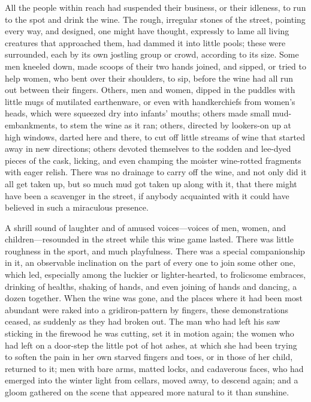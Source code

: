 All the people within reach had suspended their business, or their
idleness, to run to the spot and drink the wine.  The rough,
irregular stones of the street, pointing every way, and designed,
one might have thought, expressly to lame all living creatures that
approached them, had dammed it into little pools; these were surrounded,
each by its own jostling group or crowd, according to its size.
Some men kneeled down, made scoops of their two hands joined, and
sipped, or tried to help women, who bent over their shoulders, to
sip, before the wine had all run out between their fingers.  Others,
men and women, dipped in the puddles with little mugs of mutilated
earthenware, or even with handkerchiefs from women's heads, which
were squeezed dry into infants' mouths; others made small mud-%
embankments, to stem the wine as it ran; others, directed by
lookers-on up at high windows, darted here and there, to cut off
little streams of wine that started away in new directions; others
devoted themselves to the sodden and lee-dyed pieces of the cask,
licking, and even champing the moister wine-rotted fragments with
eager relish.  There was no drainage to carry off the wine, and not
only did it all get taken up, but so much mud got taken up along with
it, that there might have been a scavenger in the street, if anybody
acquainted with it could have believed in such a miraculous presence.

A shrill sound of laughter and of amused voices---voices of men,
women, and children---resounded in the street while this wine game
lasted.  There was little roughness in the sport, and much playfulness.
There was a special companionship in it, an observable inclination on
the part of every one to join some other one, which led, especially
among the luckier or lighter-hearted, to frolicsome embraces,
drinking of healths, shaking of hands, and even joining of hands and
dancing, a dozen together.  When the wine was gone, and the places
where it had been most abundant were raked into a gridiron-pattern by
fingers, these demonstrations ceased, as suddenly as they had broken
out.  The man who had left his saw sticking in the firewood he was
cutting, set it in motion again; the women who had left on a door-step
the little pot of hot ashes, at which she had been trying to soften
the pain in her own starved fingers and toes, or in those of her
child, returned to it; men with bare arms, matted locks, and cadaverous
faces, who had emerged into the winter light from cellars, moved
away, to descend again; and a gloom gathered on the scene that
appeared more natural to it than sunshine.


